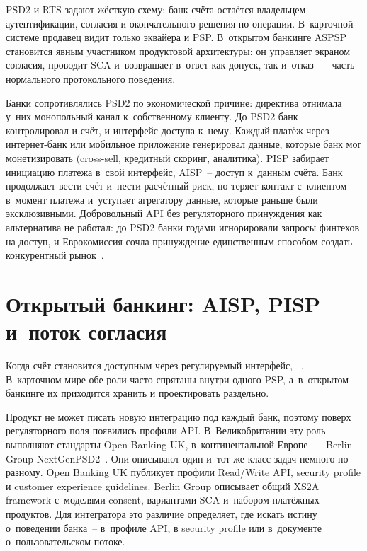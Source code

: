 PSD2 и RTS задают жёсткую схему: банк счёта остаётся владельцем
аутентификации, согласия и окончательного решения по операции.
В~карточной системе продавец видит только эквайера и PSP. В~открытом
банкинге ASPSP становится явным участником продуктовой
архитектуры: он управляет экраном согласия, проводит SCA
и~возвращает в~ответ как допуск, так и~отказ~--- часть нормального
протокольного поведения.

Банки сопротивлялись PSD2 по экономической причине:
директива отнимала у~них монопольный канал к~собственному клиенту.
До PSD2 банк контролировал и счёт, и интерфейс доступа к~нему. Каждый платёж
через интернет-банк или мобильное приложение генерировал данные,
которые банк мог монетизировать (cross-sell, кредитный скоринг,
аналитика). PISP забирает инициацию платежа в~свой интерфейс,
AISP~-- доступ к~данным счёта. Банк продолжает вести счёт и~нести
расчётный риск, но теряет контакт с~клиентом в~момент платежа
и~уступает агрегатору данные, которые раньше были эксклюзивными.
Добровольный API без регуляторного принуждения как альтернатива
не работал: до PSD2 банки годами игнорировали запросы финтехов
на доступ, и Еврокомиссия сочла принуждение единственным способом
создать конкурентный рынок~\cite{psd2}.

\section{Открытый банкинг: AISP, PISP и~поток согласия}\label{sec:open-banking}

Когда счёт становится доступным через регулируемый интерфейс,
~\cite{psd2}. В~карточном
мире обе роли часто спрятаны внутри одного PSP, а~в~открытом банкинге
их приходится хранить и проектировать раздельно.

Продукт не может писать новую интеграцию под каждый банк, поэтому
поверх регуляторного поля появились профили API. В~Великобритании
эту роль выполняют стандарты Open Banking UK, в~континентальной
Европе~--- Berlin Group NextGenPSD2~\cite{openbanking-uk,berlin-group}.
Они описывают один и~тот же класс задач немного по-разному.
Open Banking UK публикует профили Read/Write API, security profile
и customer experience guidelines. Berlin Group описывает общий XS2A
framework с~моделями consent, вариантами SCA и~набором платёжных
продуктов. Для интегратора это различие определяет, где искать истину
о~поведении банка~-- в~профиле API, в security profile или
в~документе о~пользовательском потоке.

